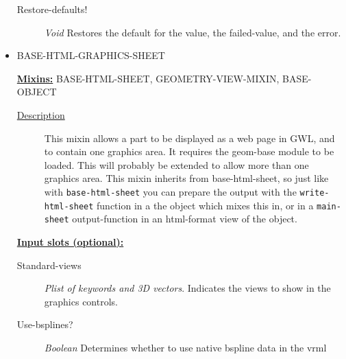 \documentclass [11pt]{book}
\begin{document}
\begin{itemize}
\begin{description}
\item [Restore-defaults!]
\emph{Void} Restores the default for the value, the failed-value, and the error.


\end{description}







\item {}BASE-HTML-GRAPHICS-SHEET


\textbf{
\underline{Mixins:}} BASE-HTML-SHEET, GEOMETRY-VIEW-MIXIN, BASE-OBJECT





\begin{description}

\item [
\underline{Description}]


This mixin allows a part to be displayed as a web page in GWL, and
to contain one graphics area. It requires the geom-base module to be loaded. This will 
probably be extended to allow more than one graphics area. This mixin inherits from 
base-html-sheet, so just like with \texttt{base-html-sheet} you can prepare the output 
with the \texttt{write-html-sheet} function  in a the object which mixes  this in, or 
in a \texttt{main-sheet} output-function in an html-format view of the object.






\end{description}








\textbf{
\underline{Input slots (optional):}}

\begin{description}

\item [Standard-views]
\emph{Plist of keywords and 3D vectors}.
Indicates the views to show in the graphics controls.


\item [Use-bsplines?]
\emph{Boolean} Determines whether to use native bspline data in the vrml


\end{description}







\end{itemize}
\end{document}
